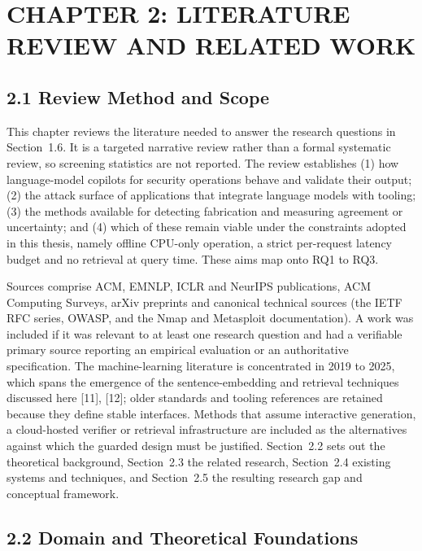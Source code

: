 \documentclass[
]{article}
\begin{document}
\hypertarget{chapter-2-literature-review-and-related-work}{%
\section{CHAPTER 2: LITERATURE REVIEW AND RELATED
WORK}\label{chapter-2-literature-review-and-related-work}}

\hypertarget{review-method-and-scope}{%
\subsection{2.1 Review Method and Scope}\label{review-method-and-scope}}

This chapter reviews the literature needed to answer the research
questions in Section~1.6. It is a targeted narrative review rather than
a formal systematic review, so screening statistics are not reported.
The review establishes (1) how language-model copilots for security
operations behave and validate their output; (2) the attack surface of
applications that integrate language models with tooling; (3) the
methods available for detecting fabrication and measuring agreement or
uncertainty; and (4) which of these remain viable under the constraints
adopted in this thesis, namely offline CPU-only operation, a strict
per-request latency budget and no retrieval at query time. These aims
map onto RQ1 to RQ3.

Sources comprise ACM, EMNLP, ICLR and NeurIPS publications, ACM
Computing Surveys, arXiv preprints and canonical technical sources (the
IETF RFC series, OWASP, and the Nmap and Metasploit documentation). A
work was included if it was relevant to at least one research question
and had a verifiable primary source reporting an empirical evaluation or
an authoritative specification. The machine-learning literature is
concentrated in 2019 to 2025, which spans the emergence of the
sentence-embedding and retrieval techniques discussed here {[}11{]},
{[}12{]}; older standards and tooling references are retained because
they define stable interfaces. Methods that assume interactive
generation, a cloud-hosted verifier or retrieval infrastructure are
included as the alternatives against which the guarded design must be
justified. Section~2.2 sets out the theoretical background, Section~2.3
the related research, Section~2.4 existing systems and techniques, and
Section~2.5 the resulting research gap and conceptual framework.

\hypertarget{domain-and-theoretical-foundations}{%
\subsection{2.2 Domain and Theoretical
Foundations}\label{domain-and-theoretical-foundations}}
\end{document}

